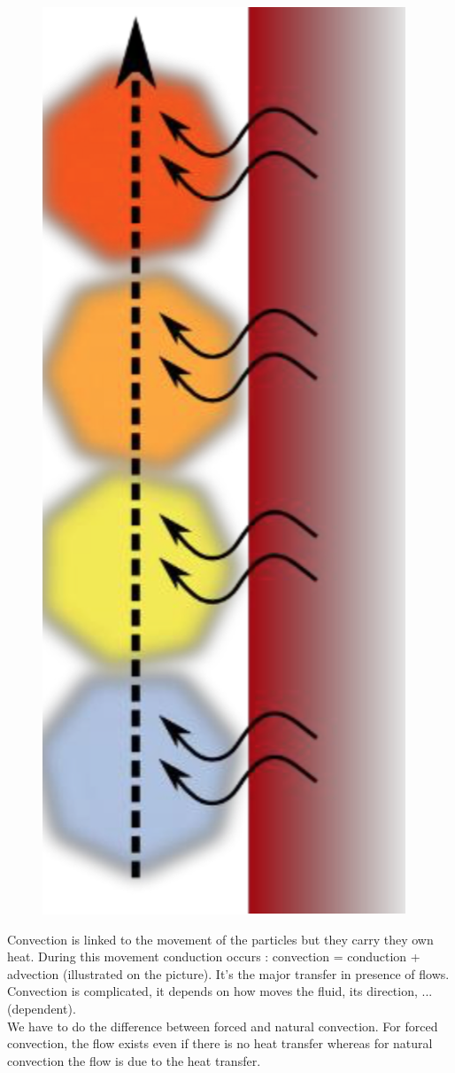  		\begin{figure}
 		\vspace{-5mm}
 		\includegraphics[scale=0.15]{ch3/2}
 		\end{figure}
		Convection is linked to the movement of the particles but they carry they own heat. During this movement conduction occurs : convection = conduction + advection (illustrated on the picture). It's the major transfer in presence of flows. Convection is complicated, it depends on how moves the fluid, its direction, ... (dependent). \\
		We have to do the difference between forced and natural convection. For forced convection, the flow exists even if there is no heat transfer whereas for natural convection the flow is due to the heat transfer. 
		
